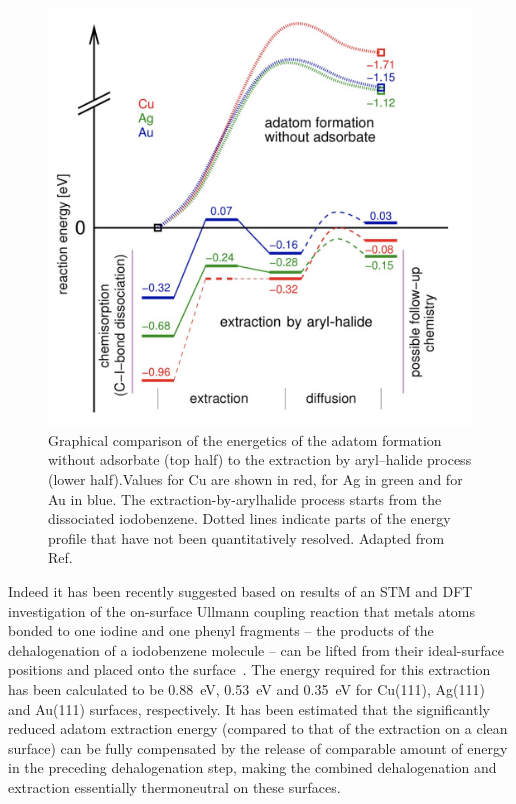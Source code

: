 \documentclass[aps,prb,reprint,amsmath,amssymb]{revtex4-1}
\newcommand{\lock}{\color{red}}
\newcommand{\lock}{\color{black}}
\begin{document}
\begin{figure}[htb]
\centering
\includegraphics[width=0.75\columnwidth]{Fig/Adatom-formation.png}
\caption{Graphical comparison of the energetics of the adatom formation without adsorbate (top half) to the extraction by aryl–halide process (lower half).Values for Cu are shown in red, for Ag in green and for Au in blue. The extraction-by-arylhalide process starts from the dissociated iodobenzene. Dotted lines indicate parts of the energy profile that have not been quantitatively resolved. Adapted from Ref.~\cite{chemeurope2017}}
\label{fig:3}
\end{figure}

\fi

{\lock

Indeed it has been recently suggested based on results of an STM and DFT investigation of the on-surface Ullmann coupling reaction that metals atoms bonded to one iodine and one phenyl fragments -- the products of the dehalogenation of a iodobenzene molecule -- can be lifted from their ideal-surface positions and placed onto the surface~\cite{chemeurope2017}. 
%
The energy required for this extraction has been calculated to be \SI{0.88}{\electronvolt}, \SI{0.53}{\electronvolt} and \SI{0.35}{\electronvolt} for Cu(111), Ag(111) and Au(111) surfaces, respectively. %
%
It has been estimated that the significantly reduced adatom extraction energy (compared to that of the extraction on a clean surface) can be fully compensated by the release of comparable amount of energy in the preceding dehalogenation step, making the combined dehalogenation and extraction essentially thermoneutral on these surfaces.

}
\end{document}
